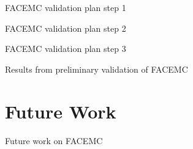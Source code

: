 \documentclass{beamer}
\begin{document}
\begin{frame}{FACEMC validation plan step 1}

\end{frame}

\begin{frame}{FACEMC validation plan step 2}

\end{frame}

\begin{frame}{FACEMC validation plan step 3}

\end{frame}

\begin{frame}{Results from preliminary validation of FACEMC}

\end{frame}

\section{Future Work}
\begin{frame}{Future work on FACEMC}

\end{frame}

\end{document}
